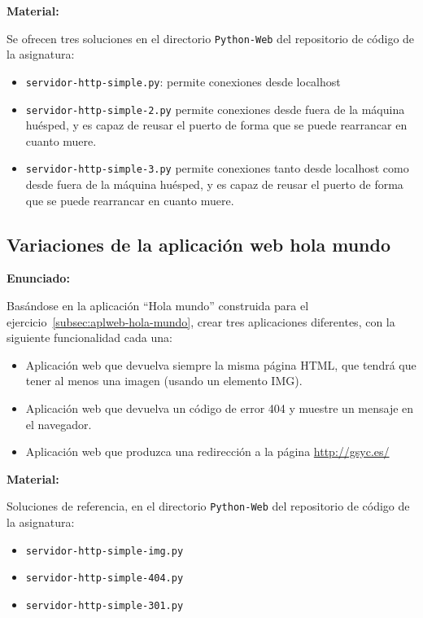 \textbf{Material:}

Se ofrecen tres soluciones en el directorio \verb|Python-Web| del repositorio de código de la asignatura:

\begin{itemize}
\item \verb|servidor-http-simple.py|: permite conexiones desde localhost
\item \verb|servidor-http-simple-2.py| permite conexiones desde fuera de la máquina huésped, y es capaz de reusar el puerto de forma que se puede rearrancar en cuanto muere.
\item \verb|servidor-http-simple-3.py| permite conexiones tanto desde localhost como desde fuera de la máquina huésped, y es capaz de reusar el puerto de forma que se puede rearrancar en cuanto muere.
\end{itemize}

\subsection{Variaciones de la aplicación web hola mundo}
\label{subsec:aplweb-hola-mundo-var}

\textbf{Enunciado:}

Basándose en la aplicación ``Hola mundo'' construida para el ejercicio~\ref{subsec:aplweb-hola-mundo}, crear tres aplicaciones diferentes, con la siguiente funcionalidad cada una:

\begin{itemize}
\item Aplicación web que devuelva siempre la misma página HTML, que tendrá que tener al menos una imagen (usando un elemento IMG).

\item Aplicación web que devuelva un código de error 404 y muestre un mensaje en el navegador.

\item Aplicación web que produzca una redirección a la página \url{http://gsyc.es/}
\end{itemize}

\textbf{Material:}

Soluciones de referencia, en el directorio \verb|Python-Web| del repositorio de código de la asignatura:


\begin{itemize}
\item \verb|servidor-http-simple-img.py|
\item \verb|servidor-http-simple-404.py|
\item \verb|servidor-http-simple-301.py|
\end{itemize}

